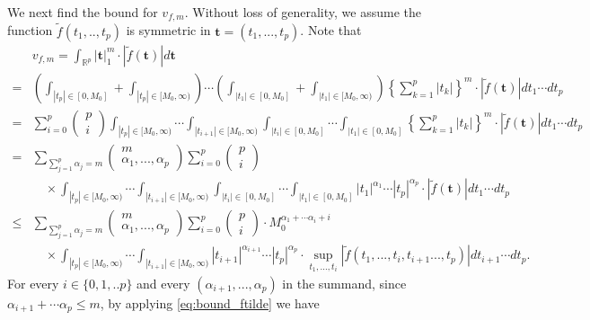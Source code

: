 \documentclass[11pt]{article}
\def\bs{\boldsymbol}
\numberwithin{equation}{section}
\begin{document}
We next find the bound for $v_{f,m}$. Without loss of generality, we assume the function $\widetilde{f}(t_1,..,t_p)$ is symmetric in $\bs{t}=(t_1,...,t_p)$. Note that
\begin{align*}
	&v_{f,m}=\int_{\mathbb{R}^p}|\boldsymbol{t}|_1^m\cdot |\widetilde{f}(\boldsymbol{t})|d\boldsymbol{t}\\
	=&\left(\int_{|t_p|\in [0,M_0]}+\int_{|t_p|\in [M_0,\infty)}\right)\cdots \left(\int_{|t_1|\in [0,M_0]}+\int_{|t_1|\in [M_0,\infty)}\right)\left\{\sum_{k=1}^p|t_k|\right\}^m\cdot |\widetilde{f}(\bs{t})|dt_1\cdots dt_p\\
	=&  \sum_{i=0}^p \begin{pmatrix}
		p\\
		i
	\end{pmatrix} \int_{|t_p|\in [M_0,\infty)}\cdots\int_{|t_{i+1}|\in [M_0,\infty)}  \int_{|t_i|\in [0,M_0]}\cdots\int_{|t_1|\in [0,M_0]}\left\{\sum_{k=1}^p|t_k|\right\}^m\cdot |\widetilde{f}(\bs{t})|dt_1\cdots dt_p\\
	=&\sum_{\sum_{j=1}^p\alpha_j=m}\begin{pmatrix}
		m\\
		\alpha_1,...,\alpha_p
	\end{pmatrix}  \sum_{i=0}^p \begin{pmatrix}
		p\\
		i
	\end{pmatrix}\\
	&\quad \times \int_{|t_p|\in [M_0,\infty)}\cdots\int_{|t_{i+1}|\in [M_0,\infty)}  \int_{|t_i|\in [0,M_0]}\cdots\int_{|t_1|\in [0,M_0]}|t_1|^{\alpha_1}\cdots |t_p|^{\alpha_p}\cdot |\widetilde{f}(\bs{t})|dt_1\cdots dt_p\\
	\leq &\sum_{\sum_{j=1}^p\alpha_j=m}\begin{pmatrix}
		m\\
		\alpha_1,...,\alpha_p
	\end{pmatrix}  \sum_{i=0}^p \begin{pmatrix}
		p\\
		i
	\end{pmatrix}\cdot M_0^{\alpha_1+\cdots\alpha_i+i}\\
	&\quad \times \int_{|t_p|\in [M_0,\infty)}\cdots\int_{|t_{i+1}|\in [M_0,\infty)}  |t_{i+1}|^{\alpha_{i+1}}\cdots |t_p|^{\alpha_p}\cdot \sup_{t_1,...,t_i}|\widetilde{f}(t_1,...,t_{i},t_{i+1}...,t_p)|dt_{i+1}\cdots dt_p.
\end{align*}	
For every $i\in\{0,1,..p\}$ and every $(\alpha_{i+1},...,\alpha_{p})$ in the summand, since $\alpha_{i+1}+\cdots \alpha_p\leq m$, by applying \eqref{eq:bound_ftilde} we have
\end{document}
